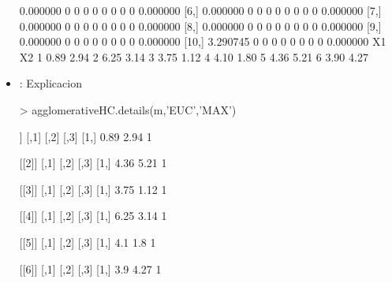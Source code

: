 \documentclass[a4paper, 12pt]{article}
\begin{document}
\begin{itemize}
\begin{Schunk}
\begin{Soutput}
 [5,] 0.000000    0    0    0    0    0    0    0    0 0.000000
 [6,] 0.000000    0    0    0    0    0    0    0    0 0.000000
 [7,] 0.000000    0    0    0    0    0    0    0    0 0.000000
 [8,] 0.000000    0    0    0    0    0    0    0    0 0.000000
 [9,] 0.000000    0    0    0    0    0    0    0    0 0.000000
[10,] 3.290745    0    0    0    0    0    0    0    0 0.000000
    X1   X2
1 0.89 2.94
2 6.25 3.14
3 3.75 1.12
4 4.10 1.80
5 4.36 5.21
6 3.90 4.27
\end{Soutput}
\end{Schunk}
		\item \texttt{}: 
		Explicacion
\begin{Schunk}
\begin{Sinput}
> agglomerativeHC.details(m,'EUC','MAX')
\end{Sinput}
\begin{Soutput}
[[1]]
     [,1] [,2] [,3]
[1,] 0.89 2.94    1

[[2]]
     [,1] [,2] [,3]
[1,] 4.36 5.21    1

[[3]]
     [,1] [,2] [,3]
[1,] 3.75 1.12    1

[[4]]
     [,1] [,2] [,3]
[1,] 6.25 3.14    1

[[5]]
     [,1] [,2] [,3]
[1,]  4.1  1.8    1

[[6]]
     [,1] [,2] [,3]
[1,]  3.9 4.27    1


\end{Soutput}
\end{Schunk}
\end{itemize}
\end{document}
